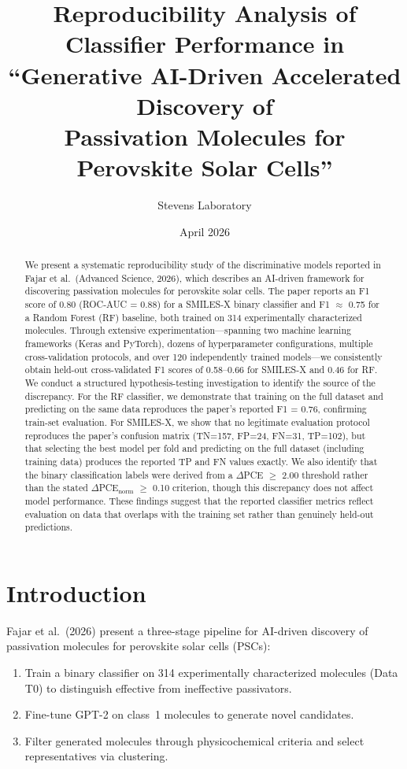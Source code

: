 \documentclass[11pt,a4paper]{article}
\title{Reproducibility Analysis of Classifier Performance in\\
``Generative AI-Driven Accelerated Discovery of\\
Passivation Molecules for Perovskite Solar Cells''}
\author{Stevens Laboratory}
\date{April 2026}
\begin{document}
\maketitle

\begin{abstract}
We present a systematic reproducibility study of the discriminative models reported in Fajar et al.\ (Advanced Science, 2026), which describes an AI-driven framework for discovering passivation molecules for perovskite solar cells. The paper reports an F1 score of 0.80 (ROC-AUC = 0.88) for a SMILES-X binary classifier and F1 $\approx$ 0.75 for a Random Forest (RF) baseline, both trained on 314 experimentally characterized molecules. Through extensive experimentation---spanning two machine learning frameworks (Keras and PyTorch), dozens of hyperparameter configurations, multiple cross-validation protocols, and over 120 independently trained models---we consistently obtain held-out cross-validated F1 scores of 0.58--0.66 for SMILES-X and 0.46 for RF. We conduct a structured hypothesis-testing investigation to identify the source of the discrepancy. For the RF classifier, we demonstrate that training on the full dataset and predicting on the same data reproduces the paper's reported F1 = 0.76, confirming train-set evaluation. For SMILES-X, we show that no legitimate evaluation protocol reproduces the paper's confusion matrix (TN=157, FP=24, FN=31, TP=102), but that selecting the best model per fold and predicting on the full dataset (including training data) produces the reported TP and FN values exactly. We also identify that the binary classification labels were derived from a $\Delta$PCE $\geq$ 2.00 threshold rather than the stated $\Delta$PCE$_{\text{norm}}$ $\geq$ 0.10 criterion, though this discrepancy does not affect model performance. These findings suggest that the reported classifier metrics reflect evaluation on data that overlaps with the training set rather than genuinely held-out predictions.
\end{abstract}

\tableofcontents
\newpage

\section{Introduction}

Fajar et al.\ (2026) present a three-stage pipeline for AI-driven discovery of passivation molecules for perovskite solar cells (PSCs):
\begin{enumerate}[nosep]
    \item Train a binary classifier on 314 experimentally characterized molecules (Data T0) to distinguish effective from ineffective passivators.
    \item Fine-tune GPT-2 on class~1 molecules to generate novel candidates.
    \item Filter generated molecules through physicochemical criteria and select representatives via clustering.
\end{enumerate}
\end{document}
